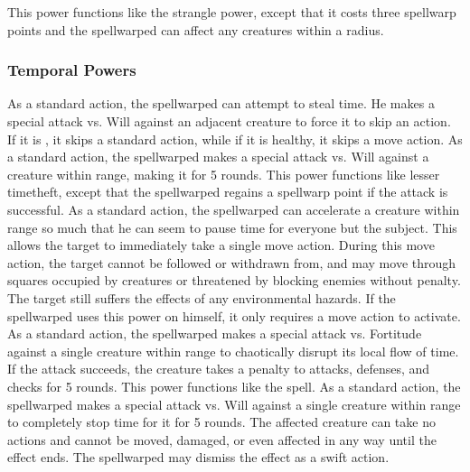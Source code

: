 This power functions like the strangle power, except that it costs three spellwarp points and the spellwarped can affect any creatures within a \areasmall radius.

\subsubsection{Temporal Powers}
As a standard action, the spellwarped can attempt to steal time.
He makes a special attack vs. Will against an adjacent creature to force it to skip an action.
If it is \bloodied, it skips a standard action, while if it is healthy, it skips a move action.
As a standard action, the spellwarped makes a special attack vs. Will against a creature within \rngclose range, making it \slowed for 5 rounds.
This power functions like lesser timetheft, except that the spellwarped regains a spellwarp point if the attack is successful.
As a standard action, the spellwarped can accelerate a creature within \rngclose range so much that he can seem to pause time for everyone but the subject.
This allows the target to immediately take a single move action.
During this move action, the target cannot be followed or withdrawn from, and may move through squares occupied by creatures or threatened by blocking enemies without penalty.
The target still suffers the effects of any environmental hazards.
If the spellwarped uses this power on himself, it only requires a move action to activate.
As a standard action, the spellwarped makes a special attack vs. Fortitude against a single creature within \rngmed range to chaotically disrupt its local flow of time.
If the attack succeeds, the creature takes a  penalty to attacks, defenses, and checks for 5 rounds.
 This power functions like the 
spell.
As a standard action, the spellwarped makes a special attack vs. Will against a single creature within \rngclose range to completely stop time for it for 5 rounds.
The affected creature can take no actions and cannot be moved, damaged, or even affected in any way until the effect ends.
The spellwarped may dismiss the effect as a swift action.

